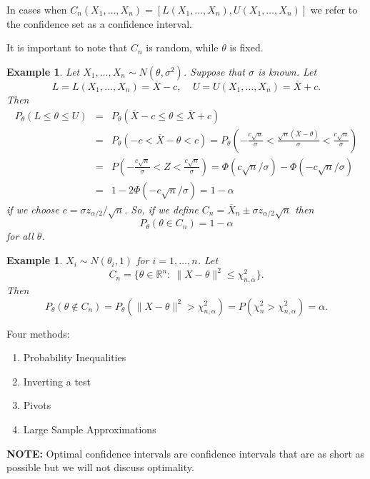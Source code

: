 \documentclass[twoside,12pt]{article}
\newtheorem{example}[theorem]{Example}
\begin{document}
In cases when $C_n(X_1,\ldots,X_n) = [L(X_1,\ldots,X_n), U(X_1,\ldots,X_n)]$ we refer to the confidence set as a confidence interval.

It is important to note that $C_n$ is random, while $\theta$ is fixed.



\begin{example}
Let $X_1,\ldots,X_n\sim N(\theta,\sigma^2)$.
Suppose that $\sigma$ is known.
Let
$$
L = L(X_1,\ldots, X_n)=\overline{X}-c,\ \ \ \ \ 
U = U(X_1,\ldots, X_n)=\overline{X}+c.
$$
Then
\begin{eqnarray*}
P_\theta(L \leq \theta \leq U) &=&
P_\theta(\overline{X}-c \leq \theta \leq \overline{X}+c)\\
&=&
P_\theta(-c < \overline{X}-\theta < c) =
P_\theta\left(-\frac{c\sqrt{n}}{\sigma} < 
\frac{\sqrt{n}(\overline{X}-\theta)}{\sigma} < \frac{c\sqrt{n}}{\sigma}\right)\\
&=& P\left(-\frac{c\sqrt{n}}{\sigma} < Z < \frac{c\sqrt{n}}{\sigma}\right) = 
\Phi(c\sqrt{n}/\sigma)-\Phi(-c\sqrt{n}/\sigma) \\
&=& 1-2\Phi(-c\sqrt{n}/\sigma) = 1-\alpha
\end{eqnarray*}
if we choose $c = \sigma z_{\alpha/2}/\sqrt{n}$.
So,
if we define
$C_n = \overline{X}_n \pm \sigma z_{\alpha/2}\sqrt{n}$ then
$$
P_\theta(\theta \in C_n)  = 1-\alpha
$$
for all $\theta$.
\end{example}



\begin{example}
$X_i\sim N(\theta_i,1)$ for
$i=1,\ldots, n$.
Let
$$
C_n = \{ \theta\in\mathbb{R}^n:\ \|X-\theta\|^2 \leq \chi^2_{n,\alpha}\}.
$$
Then
$$
P_\theta(\theta\notin C_n) = P_\theta( \|X-\theta\|^2 > \chi^2_{n,\alpha}) =
P(\chi^2_n > \chi^2_{n,\alpha}) = \alpha.
$$
\end{example}







Four methods:
\begin{enumerate}
\item Probability Inequalities
\item Inverting a test
\item Pivots
\item Large Sample Approximations
\end{enumerate}

{\bf NOTE:}
Optimal confidence intervals are
confidence intervals that are as short as possible
but we will not discuss optimality.
\end{document}
